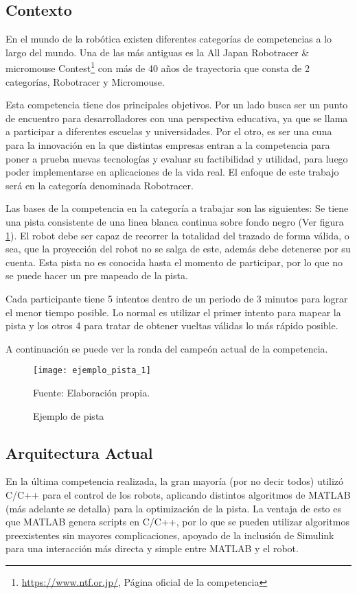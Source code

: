
\subsection{Contexto}

En el mundo de la robótica existen diferentes categorías de competencias a lo largo del mundo. Una de las más antiguas es la All Japan Robotracer \& micromouse Contest\footnote{\url{https://www.ntf.or.jp/}, Página oficial de la competencia} con más de 40 años de trayectoria que consta de 2 categorías, Robotracer y Micromouse.

Esta competencia tiene dos principales objetivos. Por un lado busca ser un punto de encuentro para desarrolladores con una perspectiva educativa, ya que se llama a participar a diferentes escuelas y universidades. Por el otro, es ser una cuna para la innovación en la que distintas empresas entran a la competencia para poner a prueba nuevas tecnologías y evaluar su factibilidad y utilidad, para luego poder implementarse en aplicaciones de la vida real. El enfoque de este trabajo será en la categoría denominada Robotracer.

Las bases de la competencia en la categoría a trabajar son las siguientes: Se tiene una pista consistente de una linea blanca continua sobre fondo negro (Ver figura \ref{fig:pista1}). El robot debe ser capaz de recorrer la totalidad del trazado de forma válida, o sea, que la proyección del robot no se salga de este, además debe detenerse por su cuenta. Esta pista no es conocida hasta el momento de participar, por lo que no se puede hacer un pre mapeado de la pista.

Cada participante tiene 5 intentos dentro de un periodo de 3 minutos para lograr el menor tiempo posible. Lo normal es utilizar el primer intento para mapear la pista y los otros 4 para tratar de obtener vueltas válidas lo más rápido posible.

A continuación se puede ver la ronda del campeón actual de la competencia. \cite{ganador2023}

\begin{figure}[h]
\centering
\texttt{[image: ejemplo\_pista\_1]}
\caption{\label{fig:pista1} Ejemplo de pista} Fuente: Elaboración propia.
\end{figure}

\subsection{Arquitectura Actual}
En la última competencia realizada, la gran mayoría (por no decir todos) utilizó C/C++ para el control de los robots, aplicando distintos algoritmos de MATLAB (más adelante se detalla) para la optimización de la pista. La ventaja de esto es que MATLAB genera scripts en C/C++, por lo que se pueden utilizar algoritmos preexistentes sin mayores complicaciones, apoyado de la inclusión de Simulink para una interacción más directa y simple entre MATLAB y el robot.

